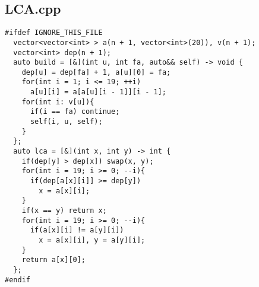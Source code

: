 \documentclass[UTF8, a4paper, titlepage, twoside]{ctexart}
\begin{document}
\subsection{LCA.cpp}
\begin{verbatim}
#ifdef IGNORE_THIS_FILE
  vector<vector<int> > a(n + 1, vector<int>(20)), v(n + 1);
  vector<int> dep(n + 1);
  auto build = [&](int u, int fa, auto&& self) -> void {
    dep[u] = dep[fa] + 1, a[u][0] = fa;
    for(int i = 1; i <= 19; ++i)
      a[u][i] = a[a[u][i - 1]][i - 1];
    for(int i: v[u]){
      if(i == fa) continue;
      self(i, u, self);
    }
  };
  auto lca = [&](int x, int y) -> int {
    if(dep[y] > dep[x]) swap(x, y);
    for(int i = 19; i >= 0; --i){
      if(dep[a[x][i]] >= dep[y]) 
        x = a[x][i];
    }
    if(x == y) return x;
    for(int i = 19; i >= 0; --i){
      if(a[x][i] != a[y][i])
        x = a[x][i], y = a[y][i];
    }
    return a[x][0];
  };
#endif



\end{verbatim}
\end{document}
